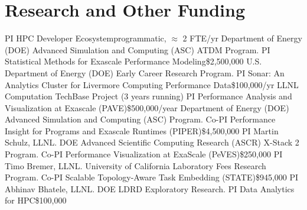 \section{Research and Other Funding}
		{PI}
		{HPC Developer Ecosystem}{}{programmatic, $\approx$ 2 FTE/yr}
		{Department of Energy (DOE) Advanced Simulation and Computing (ASC) ATDM Program.}
		{PI}
		{Statistical Methods for Exascale Performance Modeling}{}{\$2,500,000}
		{U.S. Department of Energy (DOE) Early Career Research Program.}
		{PI}
		{Sonar: An Analytics Cluster for Livermore Computing Performance Data}{}{\$100,000/yr}
		{LLNL Computation TechBase Project (3 years running)}
		{PI}
		{Performance Analysis and Visualization at Exascale (PAVE)}{}{\$500,000/year}
		{%
		 Department of Energy (DOE) Advanced Simulation and Computing (ASC) Program.}
		{Co-PI}
		{Performance Insight for Programs and Exascale Runtimes (PIPER)}{}{\$4,500,000}
		{PI Martin Schulz, LLNL. DOE Advanced Scientific Computing Research (ASCR)
		 X-Stack 2 Program.}
		{Co-PI}
		{Performance Visualization at ExaScale (PeVES)}{}{\$250,000}
		{PI Timo Bremer, LLNL. University of California Laboratory Fees Research Program.}
		{Co-PI}
		{Scalable Topology-Aware Task Embedding (STATE)}{}{\$945,000}
		{PI Abhinav Bhatele, LLNL. DOE LDRD Exploratory Research.}
		{PI}
		{Data Analytics for HPC}{}{\$100,000}
		{}
